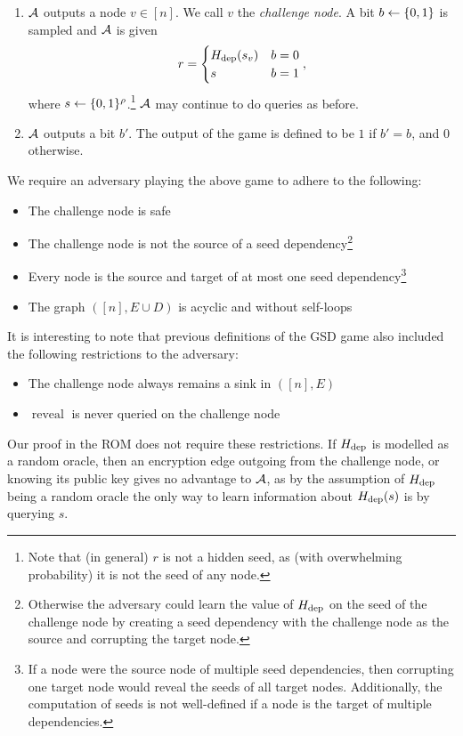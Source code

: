 \begin{definition}
\begin{enumerate}[1.]
\begin{itemize}
		      \end{itemize}
		\item \label{def:sd-gsd-game-step-challenge} $\mathcal{A}$ outputs a node $v \in [n]$. We call $v$ the \emph{challenge node}. A bit $b \leftarrow \{0, 1\}$ is sampled and $\mathcal{A}$ is given
		      \[
			      r = \begin{cases}
				      H_\mathrm{dep}(s_v) & b = 0 \\
				      s          & b = 1
			      \end{cases},
		      \]
		      where $s \leftarrow \{0, 1\}^\rho$.\footnote{Note that (in general) $r$ is not a hidden seed, as (with overwhelming probability) it is not the seed of any node.} $\mathcal{A}$ may continue to do queries as before.
		\item \label{def:sd-gsd-game-step-output} $\mathcal{A}$ outputs a bit $b'$. The output of the game is defined to be $1$ if $b' = b$, and $0$ otherwise.
	\end{enumerate}

	We require an adversary playing the above game to adhere to the following:
	\begin{itemize}
		\item The challenge node is safe
		\item The challenge node is not the source of a seed dependency\footnote{Otherwise the adversary could learn the value of $H_\mathrm{dep}$ on the seed of the challenge node by creating a seed dependency with the challenge node as the source and corrupting the target node.}
		\item Every node is the source and target of at most one seed dependency\footnote{If a node were the source node of multiple seed dependencies, then corrupting one target node would reveal the seeds of all target nodes. Additionally, the computation of seeds is not well-defined if a node is the target of multiple dependencies.}
		\item The graph $([n], E \cup D)$ is acyclic and without self-loops
	\end{itemize}
\end{definition}

It is interesting to note that previous definitions of the GSD game also included the following restrictions to the adversary:
\begin{itemize}
	\item The challenge node always remains a sink in $([n], E)$
	\item $\operatorname{reveal}$ is never queried on the challenge node
\end{itemize}
Our proof in the ROM does not require these restrictions. If $H_\mathrm{dep}$ is modelled as a random oracle, then an encryption edge outgoing from the challenge node, or knowing its public key gives no advantage to $\mathcal{A}$, as by the assumption of $H_\mathrm{dep}$ being a random oracle the only way to learn information about $H_\mathrm{dep}(s)$ is by querying $s$.

